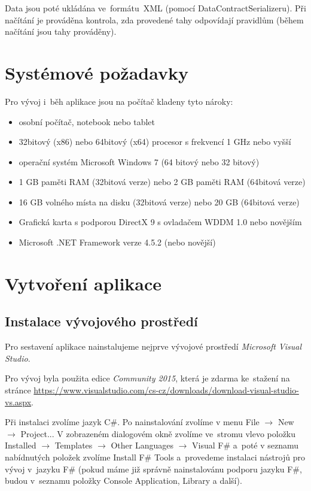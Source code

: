 \documentclass[12pt]{article}
\begin{document}
Data jsou poté ukládána ve~formátu~XML (pomocí DataContractSerializeru). Při načítání je prováděna kontrola, zda provedené tahy odpovídají pravidlům (během načítání jsou tahy prováděny).

\section{Systémové požadavky}
Pro vývoj i~běh aplikace jsou na počítač kladeny tyto nároky:
	\begin{itemize}  
		\item osobní počítač, notebook nebo tablet
		\item 32bitový (x86) nebo 64bitový (x64) procesor s frekvencí 1 GHz nebo vyšší
		\item operační systém Microsoft Windows 7 (64 bitový nebo 32 bitový)
		\item 1 GB paměti RAM (32bitová verze) nebo 2 GB paměti RAM (64bitová verze)
		\item 16 GB volného místa na disku (32bitová verze) nebo 20 GB (64bitová verze)
		\item Grafická karta s podporou DirectX 9 s ovladačem WDDM 1.0 nebo novějším
		\item Microsoft .NET Framework verze 4.5.2 (nebo novější)
	\end{itemize}

\section{Vytvoření aplikace}
\subsection{Instalace vývojového prostředí}
Pro sestavení aplikace nainstalujeme nejprve vývojové prostředí \emph{Microsoft Visual Studio}.

Pro vývoj byla použita edice \emph{Community 2015}, která je zdarma ke~stažení na stránce \url{https://www.visualstudio.com/cs-cz/downloads/download-visual-studio-vs.aspx}. 

Při instalaci zvolíme jazyk C\#. Po nainstalování zvolíme v menu File $\rightarrow$ New $\rightarrow$ Project... V zobrazeném dialogovém okně zvolíme ve~stromu vlevo položku Installed $\rightarrow$ Templates $\rightarrow$ Other Languages $\rightarrow$ Visual F\# a~poté v seznamu nabídnutých položek zvolíme Install F\# Tools a~provedeme instalaci nástrojů pro vývoj v~jazyku F\# (pokud máme již správně nainstalovánu podporu jazyku F\#, budou v~seznamu položky Console Application, Library a další).
\end{document}
